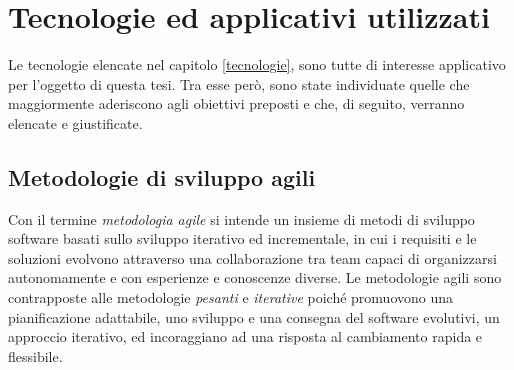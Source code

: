 
\chapter{Tecnologie ed applicativi utilizzati}
\label{tecnologieutilizzate}

Le tecnologie elencate nel capitolo \ref{tecnologie}, sono tutte di interesse applicativo per l'oggetto di questa tesi. Tra esse però, sono state individuate quelle che maggiormente aderiscono agli obiettivi preposti e che, di seguito, verranno elencate e giustificate.
\section{Metodologie di sviluppo agili}
Con il termine \textit{metodologia agile} si intende un insieme di metodi di sviluppo software basati sullo sviluppo iterativo ed incrementale, in cui i requisiti e le soluzioni evolvono attraverso una collaborazione tra team capaci di organizzarsi autonomamente e con esperienze e conoscenze diverse.
Le metodologie agili sono contrapposte alle metodologie \textit{pesanti} e \textit{iterative} poiché promuovono una pianificazione adattabile, uno sviluppo e una consegna del software evolutivi, un approccio iterativo, ed incoraggiano ad una risposta al cambiamento rapida e flessibile.

